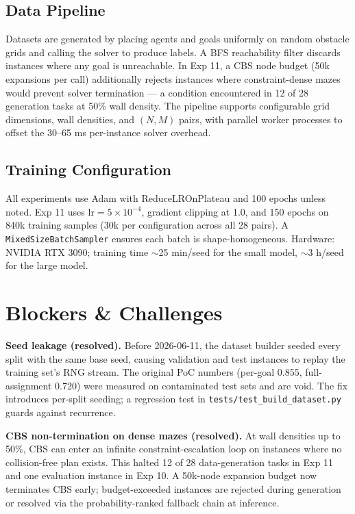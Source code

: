 \documentclass[11pt,a4paper]{article}
\begin{document}
\subsection{Data Pipeline}

Datasets are generated by placing agents and goals uniformly on random obstacle grids and calling
the solver to produce labels. A BFS reachability filter discards instances where any goal is
unreachable. In Exp 11, a CBS node budget (50k expansions per call) additionally rejects
instances where constraint-dense mazes would prevent solver termination --- a condition encountered
in 12 of 28 generation tasks at 50\% wall density. The pipeline supports configurable grid
dimensions, wall densities, and $(N,M)$ pairs, with parallel worker processes to offset the
30--65 ms per-instance solver overhead.

\subsection{Training Configuration}

All experiments use Adam with ReduceLROnPlateau and 100 epochs unless noted. Exp 11 uses
lr$=5\times10^{-4}$, gradient clipping at 1.0, and 150 epochs on 840k training samples
(30k per configuration across all 28 pairs). A \texttt{MixedSizeBatchSampler} ensures each
batch is shape-homogeneous. Hardware: NVIDIA RTX 3090; training time $\sim$25 min/seed for the
small model, $\sim$3 h/seed for the large model.

\section{Blockers \& Challenges}

\textbf{Seed leakage (resolved).} Before 2026-06-11, the dataset builder seeded every split
with the same base seed, causing validation and test instances to replay the training set's RNG
stream. The original PoC numbers (per-goal 0.855, full-assignment 0.720) were measured on
contaminated test sets and are void. The fix introduces per-split seeding; a regression test in
\texttt{tests/test\_build\_dataset.py} guards against recurrence.

\textbf{CBS non-termination on dense mazes (resolved).} At wall densities up to 50\%, CBS can
enter an infinite constraint-escalation loop on instances where no collision-free plan exists.
This halted 12 of 28 data-generation tasks in Exp 11 and one evaluation instance in Exp 10.
A 50k-node expansion budget now terminates CBS early; budget-exceeded instances are rejected
during generation or resolved via the probability-ranked fallback chain at inference.
\end{document}
